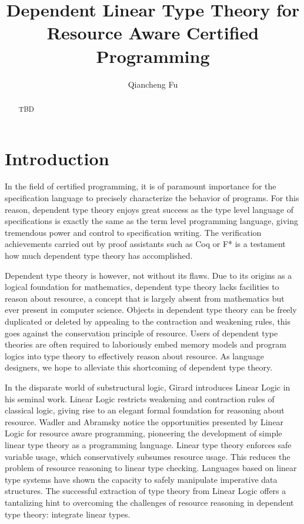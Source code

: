 \documentclass{article}
\title{Dependent Linear Type Theory for Resource Aware Certified Programming}
\author{Qiancheng Fu}
\begin{document}
  \maketitle 
  \begin{abstract}
    TBD
  \end{abstract}

  \section{Introduction}
  In the field of certified programming, it is of paramount importance for the specification language to precisely characterize the behavior of programs. For this reason, dependent type theory enjoys great success as the type level language of specifications is exactly the same as the term level programming language, giving tremendous power and control to specification writing. The verification achievements\cite{compcert,deepspec,everest} carried out by proof assistants such as Coq\cite{coq} or F*\cite{fstar} is a testament how much dependent type theory has accomplished. 
  
  Dependent type theory is however, not without its flaws. Due to its origins as a logical foundation for mathematics\cite{martinlof,cc}, dependent type theory lacks facilities to reason about resource, a concept that is largely absent from mathematics but ever present in computer science. Objects in dependent type theory can be freely duplicated or deleted by appealing to the contraction and weakening rules, this goes against the conservation principle of resource. Users of dependent type theories are often required to laboriously embed memory models and program logics into type theory to effectively reason about resource\cite{bedrock}. As language designers, we hope to alleviate this shortcoming of dependent type theory.

  In the disparate world of substructural logic, Girard introduces Linear Logic in his seminal work\cite{girard}. Linear Logic restricts weakening and contraction rules of classical logic, giving rise to an elegant formal foundation for reasoning about resource. Wadler\cite{wadler1990,wadler1991} and Abramsky\cite{abramsky1993} notice the opportunities presented by Linear Logic for resource aware programming, pioneering the development of simple linear type theory as a programming language. Linear type theory enforces safe variable usage, which conservatively subsumes resource usage. This reduces the problem of resource reasoning to linear type checking. Languages based on linear type systems have shown the capacity to safely manipulate imperative data structures\cite{l3,ats}. The successful extraction of type theory from Linear Logic offers a tantalizing hint to overcoming the challenges of resource reasoning in dependent type theory: integrate linear types.
\end{document}
